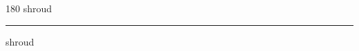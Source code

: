 
\begin{frame}
\begin{center}
\begin{turn}{180}
{\fontsize{2.5cm}{1em}\selectfont shroud}
\end{turn}
\vspace{1em}\par  
\hrule
\vspace{1em}\par  
{\fontsize{2.5cm}{1em}\selectfont shroud}
\end{center}
\end{frame}
